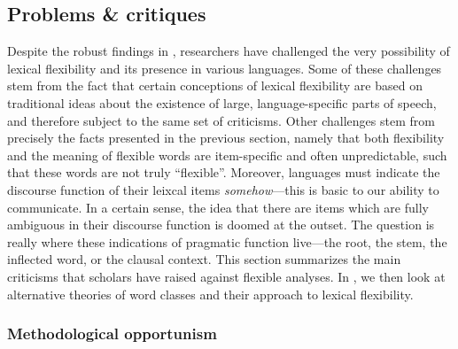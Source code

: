 \subsection{Problems \& critiques}
\label{sec:2.3.3}

Despite the robust findings in , researchers have challenged the very possibility of lexical flexibility and its presence in various languages. Some of these challenges stem from the fact that certain conceptions of lexical flexibility are based on traditional ideas about the existence of large, language-specific parts of speech, and therefore subject to the same set of criticisms. Other challenges stem from precisely the facts presented in the previous section, namely that both flexibility and the meaning of flexible words are item-specific and often unpredictable, such that these words are not truly \enquote{flexible}. Moreover, languages must indicate the discourse function of their leixcal items \emph{somehow}—this is basic to our ability to communicate. In a certain sense, the idea that there are items which are fully ambiguous in their discourse function is doomed at the outset. The question is really where these indications of pragmatic function live—the root, the stem, the inflected word, or the clausal context. This section summarizes the main criticisms that scholars have raised against flexible analyses. In , we then look at alternative theories of word classes and their approach to lexical flexibility.

\subsubsection{Methodological opportunism}
\label{sec:2.3.3.1}

